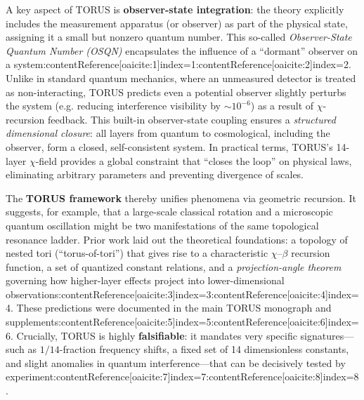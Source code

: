 \documentclass[12pt]{article}
\begin{document}
A key aspect of TORUS is \textbf{observer-state integration}: the theory explicitly includes the measurement apparatus (or observer) as part of the physical state, assigning it a small but nonzero quantum number. This so-called \emph{Observer-State Quantum Number (OSQN)} encapsulates the influence of a ``dormant'' observer on a system:contentReference[oaicite:1]{index=1}:contentReference[oaicite:2]{index=2}. Unlike in standard quantum mechanics, where an unmeasured detector is treated as non-interacting, TORUS predicts even a potential observer slightly perturbs the system (e.g. reducing interference visibility by $\sim 10^{-6}$) as a result of $\chi$-recursion feedback. This built-in observer-state coupling ensures a \emph{structured dimensional closure}: all layers from quantum to cosmological, including the observer, form a closed, self-consistent system. In practical terms, TORUS’s 14-layer $\chi$-field provides a global constraint that ``closes the loop'' on physical laws, eliminating arbitrary parameters and preventing divergence of scales. 

The \textbf{TORUS framework} thereby unifies phenomena via geometric recursion. It suggests, for example, that a large-scale classical rotation and a microscopic quantum oscillation might be two manifestations of the same topological resonance ladder. Prior work laid out the theoretical foundations: a topology of nested tori (``torus-of-tori'') that gives rise to a characteristic $\chi$–$\beta$ recursion function, a set of quantized constant relations, and a \emph{projection-angle theorem} governing how higher-layer effects project into lower-dimensional observations:contentReference[oaicite:3]{index=3}:contentReference[oaicite:4]{index=4}. These predictions were documented in the main TORUS monograph and supplements:contentReference[oaicite:5]{index=5}:contentReference[oaicite:6]{index=6}. Crucially, TORUS is highly \textbf{falsifiable}: it mandates very specific signatures—such as $1/14$-fraction frequency shifts, a fixed set of 14 dimensionless constants, and slight anomalies in quantum interference—that can be decisively tested by experiment:contentReference[oaicite:7]{index=7}:contentReference[oaicite:8]{index=8}. 
\end{document}
